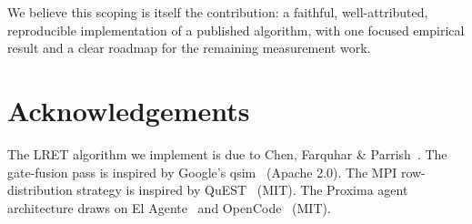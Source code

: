 \documentclass[11pt,a4paper]{article}
\begin{document}
We believe this scoping is itself the contribution: a faithful, well-attributed,
reproducible implementation of a published algorithm, with one focused empirical
result and a clear roadmap for the remaining measurement work.

\section*{Acknowledgements}

The LRET algorithm we implement is due to Chen, Farquhar \& Parrish~\cite{chen2021lret}.
The gate-fusion pass is inspired by Google's qsim~\cite{qsim} (Apache 2.0).
The MPI row-distribution strategy is inspired by QuEST~\cite{jones2019quest} (MIT).
The Proxima agent architecture draws on El Agente~\cite{zou2025elagente} and
OpenCode~\cite{opencode2025} (MIT).
\end{document}
